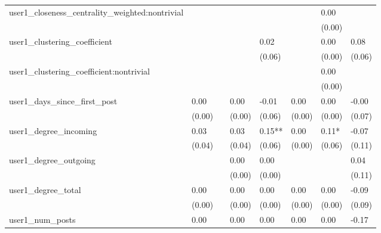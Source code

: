 \begin{table}
\begin{center}
\begin{tabular}{llllllll}
user1_closeness_centrality_weighted:nontrivial   &          &            &         &         &          & 0.00               &           \\
                                                 &          &            &         &         &          & (0.00)             &           \\
user1_clustering_coefficient                     &          &            &         & 0.02    &          & 0.00               & 0.08      \\
                                                 &          &            &         & (0.06)  &          & (0.00)             & (0.06)    \\
user1_clustering_coefficient:nontrivial          &          &            &         &         &          & 0.00               &           \\
                                                 &          &            &         &         &          & (0.00)             &           \\
user1_days_since_first_post                      & 0.00     &            & 0.00    & -0.01   & 0.00     & 0.00               & -0.00     \\
                                                 & (0.00)   &            & (0.00)  & (0.06)  & (0.00)   & (0.00)             & (0.07)    \\
user1_degree_incoming                            & 0.03     &            & 0.03    & 0.15**  & 0.00     & 0.11*              & -0.07     \\
                                                 & (0.04)   &            & (0.04)  & (0.06)  & (0.00)   & (0.06)             & (0.11)    \\
user1_degree_outgoing                            &          &            & 0.00    & 0.00    &          &                    & 0.04      \\
                                                 &          &            & (0.00)  & (0.00)  &          &                    & (0.11)    \\
user1_degree_total                               & 0.00     &            & 0.00    & 0.00    & 0.00     & 0.00               & -0.09     \\
                                                 & (0.00)   &            & (0.00)  & (0.00)  & (0.00)   & (0.00)             & (0.09)    \\
user1_num_posts                                  & 0.00     &            & 0.00    & 0.00    & 0.00     & 0.00               & -0.17     \\

\end{tabular}
\end{center}
\end{table}
